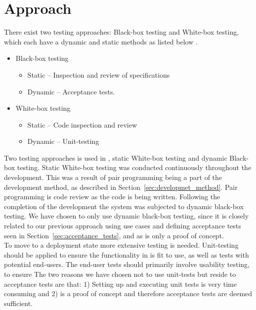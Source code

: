 \section{Approach}
\label{sec:testing_approach}
There exist two testing approaches: Black-box testing and White-box testing, which each have a dynamic and static methods as listed below \citep{Patton06}.

\begin{itemize}
	\item Black-box testing
		\begin{itemize}
			\item Static -- Inspection and review of specifications
			\item Dynamic -- Acceptance tests.
		\end{itemize}

	\item White-box testing
		\begin{itemize}
			\item Static -- Code inspection and review
			\item Dynamic -- Unit-testing
		\end{itemize}
\end{itemize}

Two testing approaches is used in \projectname{}, static White-box testing and dynamic Black-box testing.
Static White-box testing was conducted continuously throughout the development.
This was a result of pair programming being a part of the development method, as described in Section~\ref{sec:developmet_method}.
Pair programming is code review as the code is being written\citep{Patton06}.
Following the completion of the development the system was subjected to dynamic black-box testing.
We have chosen to only use dynamic black-box testing, since it is closely related to our previous approach using use cases and defining acceptance tests seen in Section~\ref{sec:acceptance_tests}, and as \projectname{} is only a proof of concept.\\

To move \projectname{} to a deployment state more extensive testing is needed.
Unit-testing should be applied to ensure the functionality in \projectname{} is fit to use, as well as tests with potential end-users.
The end-user tests should primarily involve usability testing, to ensure 
The two reasons we have chosen not to use unit-tests but reside to acceptance tests are that: 1) Setting up and executing unit tests is very time consuming and 2) \projectname{} is a proof of concept and therefore acceptance tests are deemed sufficient.\\

